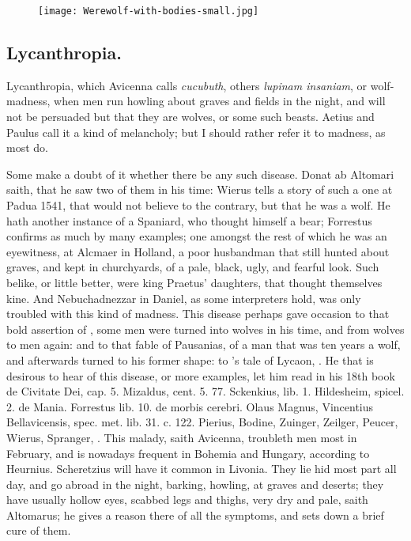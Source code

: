 {\cleartoleftpage{}
\begin{figure}[p]
  \begingroup
  \centering
  \texttt{[image: Werewolf-with-bodies-small.jpg]}
  \label{fig:werewolf}
\end{figure}

\clearpage{}
\subsection{Lycanthropia.}
Lycanthropia, which Avicenna calls \emph{cucubuth}, others
\emph{lupinam insaniam}, or wolf-madness, when men run howling about graves
and fields in the night, and will not be persuaded but that they are
wolves, or some such beasts. Aetius and Paulus call it a kind
of melancholy; but I should rather refer it to madness, as most do.

Some make a doubt of it whether there be any such disease. Donat
ab Altomari saith, that he saw two of them in his time: Wierus
tells a story of such a one at Padua 1541, that would not believe to
the contrary, but that he was a wolf. He hath another instance of a
Spaniard, who thought himself a bear; Forrestus confirms as much
by many examples; one amongst the rest of which he was an eyewitness,
at Alcmaer in Holland, a poor husbandman that still hunted about
graves, and kept in churchyards, of a pale, black, ugly, and fearful
look. Such belike, or little better, were king Praetus' daughters,
that thought themselves kine. And Nebuchadnezzar in Daniel, as some
interpreters hold, was only troubled with this kind of madness. This
disease perhaps gave occasion to that bold assertion of \Pliny{},
some men were turned into wolves in his time, and from wolves to men
again: and to that fable of Pausanias, of a man that was ten years a
wolf, and afterwards turned to his former shape: to \Ovid's tale of
Lycaon, \etc{}. He that is desirous to hear of this disease, or more
examples, let him read \Austin{} in his 18th book de Civitate Dei, cap. 5.
Mizaldus, cent. 5. 77. Sckenkius, lib. 1. Hildesheim, spicel. 2. de
Mania. Forrestus lib. 10. de morbis cerebri. Olaus Magnus, Vincentius
Bellavicensis, spec. met. lib. 31. c. 122. Pierius, Bodine, Zuinger,
Zeilger, Peucer, Wierus, Spranger, \etc{}. This malady, saith Avicenna,
troubleth men most in February, and is nowadays frequent in Bohemia and
Hungary, according to Heurnius. Scheretzius will have it common in
Livonia. They lie hid most part all day, and go abroad in the night,
barking, howling, at graves and deserts; they have usually hollow
eyes, scabbed legs and thighs, very dry and pale, saith Altomarus;
he gives a reason there of all the symptoms, and sets down a brief cure
of them.

}
